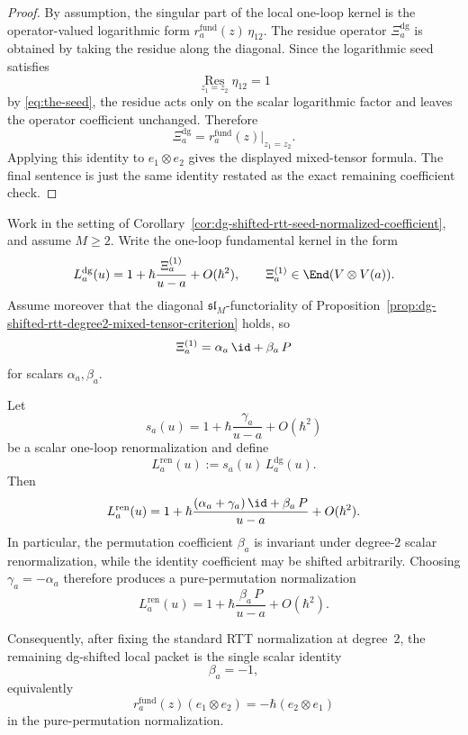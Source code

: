 \begin{proof}
By assumption, the singular part of the local one-loop kernel is the
operator-valued logarithmic form
$r_a^{\mathrm{fund}}(z)\,\eta_{12}$.  The residue operator
$\Xi_a^{\mathrm{dg}}$ is obtained by taking the residue along the
diagonal.  Since the logarithmic seed satisfies
\[
\operatorname*{Res}_{z_1=z_2}\eta_{12}=1
\]
by \eqref{eq:the-seed}, the residue acts only on the scalar logarithmic
factor and leaves the operator coefficient unchanged.  Therefore
\[
\Xi_a^{\mathrm{dg}}
=
r_a^{\mathrm{fund}}(z)\big|_{z_1=z_2}.
\]
Applying this identity to $e_1\otimes e_2$ gives the displayed
mixed-tensor formula.  The final sentence is just the same identity
restated as the exact remaining coefficient check.
\end{proof}

\begin{proposition}
\label{prop:dg-shifted-rtt-degree2-scalar-normalization}
Work in the setting of
Corollary~\ref{cor:dg-shifted-rtt-seed-normalized-coefficient}, and
assume $M\ge2$.  Write the one-loop fundamental kernel in the form
\[
L_a^{\mathrm{dg}}(u)
=
1+\hbar\frac{\Xi_a^{(1)}}{u-a}+O(\hbar^2),
\qquad
\Xi_a^{(1)}\in \End(V\otimes V(a)).
\]
Assume moreover that the diagonal $\mathfrak{sl}_M$-functoriality of
Proposition~\ref{prop:dg-shifted-rtt-degree2-mixed-tensor-criterion}
holds, so
\[
\Xi_a^{(1)}=\alpha_a\,\id+\beta_a\,P
\]
for scalars $\alpha_a,\beta_a$.

Let
\[
s_a(u)
=
1+\hbar\frac{\gamma_a}{u-a}+O(\hbar^2)
\]
be a scalar one-loop renormalization and define
\[
L_a^{\mathrm{ren}}(u):=s_a(u)\,L_a^{\mathrm{dg}}(u).
\]
Then
\[
L_a^{\mathrm{ren}}(u)
=
1+\hbar\frac{(\alpha_a+\gamma_a)\,\id+\beta_a\,P}{u-a}+O(\hbar^2).
\]
In particular, the permutation coefficient $\beta_a$ is invariant under
degree-$2$ scalar renormalization, while the identity coefficient may be
shifted arbitrarily.  Choosing $\gamma_a=-\alpha_a$ therefore produces a
pure-permutation normalization
\[
L_a^{\mathrm{ren}}(u)
=
1+\hbar\frac{\beta_a\,P}{u-a}+O(\hbar^2).
\]

Consequently, after fixing the standard RTT normalization at degree~$2$,
the remaining dg-shifted local packet is the single scalar identity
\[
\beta_a=-1,
\]
equivalently
\[
r_a^{\mathrm{fund}}(z)(e_1\otimes e_2)
=
-\hbar(e_2\otimes e_1)
\]
in the pure-permutation normalization.
\end{proposition}

